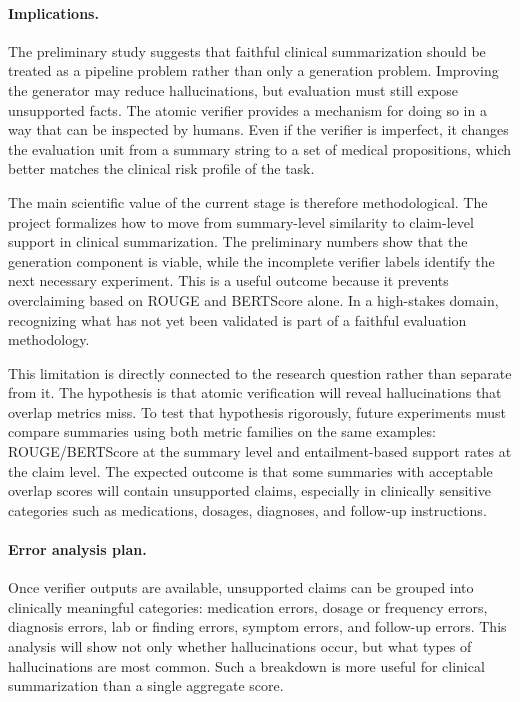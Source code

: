 \documentclass[11pt]{article}
\begin{document}
\paragraph{Implications.}
The preliminary study suggests that faithful clinical summarization should be treated as a pipeline problem rather than only a generation problem. Improving the generator may reduce hallucinations, but evaluation must still expose unsupported facts. The atomic verifier provides a mechanism for doing so in a way that can be inspected by humans. Even if the verifier is imperfect, it changes the evaluation unit from a summary string to a set of medical propositions, which better matches the clinical risk profile of the task.

The main scientific value of the current stage is therefore methodological. The project formalizes how to move from summary-level similarity to claim-level support in clinical summarization. The preliminary numbers show that the generation component is viable, while the incomplete verifier labels identify the next necessary experiment. This is a useful outcome because it prevents overclaiming based on ROUGE and BERTScore alone. In a high-stakes domain, recognizing what has not yet been validated is part of a faithful evaluation methodology.

This limitation is directly connected to the research question rather than separate from it. The hypothesis is that atomic verification will reveal hallucinations that overlap metrics miss. To test that hypothesis rigorously, future experiments must compare summaries using both metric families on the same examples: ROUGE/BERTScore at the summary level and entailment-based support rates at the claim level. The expected outcome is that some summaries with acceptable overlap scores will contain unsupported claims, especially in clinically sensitive categories such as medications, dosages, diagnoses, and follow-up instructions.

\paragraph{Error analysis plan.}
Once verifier outputs are available, unsupported claims can be grouped into clinically meaningful categories: medication errors, dosage or frequency errors, diagnosis errors, lab or finding errors, symptom errors, and follow-up errors. This analysis will show not only whether hallucinations occur, but what types of hallucinations are most common. Such a breakdown is more useful for clinical summarization than a single aggregate score.
\end{document}
